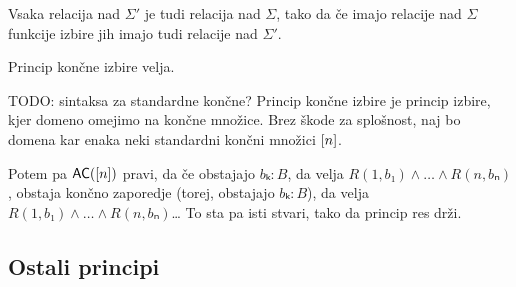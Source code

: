 \begin{dokaz}
  Vsaka relacija nad \(Σ'\) je tudi relacija nad \(Σ\), tako da če imajo
  relacije nad \(Σ\) funkcije izbire jih imajo tudi relacije nad \(Σ'\).
\end{dokaz}
\begin{trditev}
  Princip končne izbire velja.
\end{trditev}
\begin{dokaz}
  TODO: sintaksa za standardne končne?
  Princip končne izbire je princip izbire, kjer domeno omejimo na končne
  množice. Brez škode za splošnost, naj bo domena kar enaka neki
  standardni končni množici \(\left[ {n} \right]\).

  Potem pa \(\textnormal{\sffamily AC}(\left[ {n} \right])\) pravi, da če
  obstajajo \(bₖ:B\), da velja \(R(1,b₁)∧\dots ∧R(n,bₙ)\), obstaja končno
  zaporedje (torej, obstajajo \(bₖ:B\)), da velja \(R(1,b₁)∧\dots ∧R(n,bₙ)\)… To
  sta pa isti stvari, tako da princip res drži.
\end{dokaz}








\subsection{Ostali principi}

